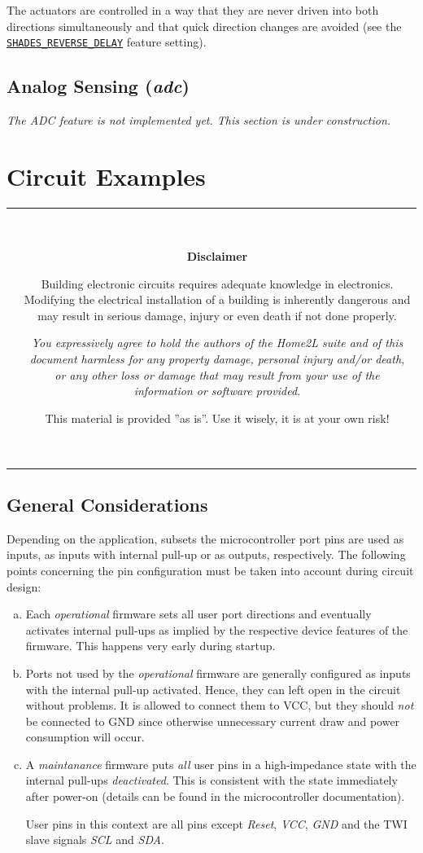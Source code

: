 \documentclass[12pt,english,parskip=half,headheight=19pt]{scrreprt}
\newcommand{\warnbox}[1]{
  \par
  \medskip
  \hfill
  \setlength\arrayrulewidth{1pt}
  \begin{tabular}[b]{c|c|}
    
    &
    \,\parbox{0.89\linewidth}{\setlength{\parskip}{0.5em}#1}\,
  \end{tabular}
  \medskip
  \par
}
\newcommand{\eshockdisclaimer}{
  \warnbox{\textbf{Disclaimer}

    Building electronic circuits requires adequate knowledge in electronics.
    Modifying the electrical installation of a building is inherently dangerous and may result in
    serious damage, injury or even death if not done properly.

    \textit{You expressively agree to hold the authors of the \textit{Home2L} suite and of this
    document harmless for any property damage, personal injury and/or death, or any other loss or
    damage that may result from your use of the information or software provided.}

    This material is provided ''as is''. Use it wisely, it is at your own risk!
  }
}
\newcommand{\refapic}[1]{\href{home2l-api_c/index.html}{\mbox{\texttt{#1}}}}            %
\begin{document}
The actuators are controlled in a way that they are never driven into both directions simultaneously and that quick direction changes are avoided (see the \refapic{SHADES\_REVERSE\_DELAY} feature setting).



\subsection{Analog Sensing (\textit{adc})}
\label{sec:brownies-features-adc}

\textit{The ADC feature is not implemented yet. This section is under construction.}





\section{Circuit Examples}
\label{sec:brownies-circuits}


\eshockdisclaimer



\subsection{General Considerations}

Depending on the application, subsets the microcontroller port pins are used as inputs, as inputs with internal pull-up or as outputs, respectively.
The following points concerning the pin configuration must be taken into account during circuit design:

\begin{enumerate}[a)]

  \item
    Each \textit{operational} firmware sets all user port directions and eventually activates 
    internal pull-ups as implied by the respective device features of the firmware.
    This happens very early during startup.

  \item
    Ports not used by the \textit{operational} firmware are generally configured as inputs with the
    internal pull-up activated. Hence, they can left open in the circuit without problems. It is
    allowed to connect them to VCC, but they should \textit{not} be connected to GND since otherwise
    unnecessary current draw and power consumption will occur.

  \item
    A \textit{maintanance} firmware puts \textit{all} user pins in a high-impedance state
    with the internal pull-ups \textit{deactivated}. This is consistent with the state immediately
    after power-on (details can be found in the microcontroller documentation).

    User pins in this context are all pins except \textit{Reset}, \textit{VCC}, \textit{GND} and the
    TWI slave signals \textit{SCL} and \textit{SDA}.

\end{enumerate}
\end{document}
